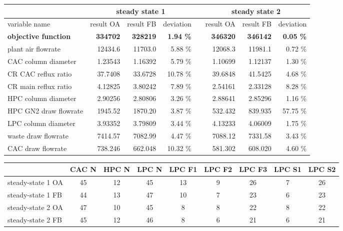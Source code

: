 \begin{minipage}{\linewidth}
    \center
    \footnotesize
    \begin{tabular}{lrrrcrrr}
        & \multicolumn{3}{c}{steady state 1} & & \multicolumn{3}{c}{steady state 2} \\ \hline
        \rowcolor{white} variable name & result OA & result FB & deviation & & result OA & result FB & deviation \\ \hline 
        \textbf{objective function} & \textbf{334702} & \textbf{328219} & \textbf{1.94 \%} & & \textbf{346320} & \textbf{346142} & \textbf{0.05 \%} \\
        plant air flowrate & 12434.6 & 11703.0 & 5.88 \% & & 12068.3 & 11981.1 & 0.72 \% \\
        CAC column diameter & 1.23543 & 1.16392 & 5.79 \% & & 1.10699 & 1.12137 & 1.30 \% \\
        CR CAC reflux ratio & 37.7408 & 33.6728 & 10.78 \% & & 39.6848 & 41.5425 & 4.68 \% \\
        CR main reflux ratio & 4.12825 & 3.80242 & 7.89 \% & & 2.54161 & 2.33128 & 8.28 \% \\
        HPC column diameter & 2.90256 & 2.80806 & 3.26 \% & & 2.88641 & 2.85296 & 1.16 \% \\
        HPC GN2 draw flowrate & 1945.52 & 1870.20 & 3.87 \% & & 532.432 & 839.935 & 57.75 \% \\
        LPC column diameter & 3.93352 & 3.79809 & 3.44 \% & & 4.13233 & 4.06009 & 1.75 \% \\
        waste draw flowrate & 7414.57 & 7082.99 & 4.47 \% & & 7088.12 & 7331.58 & 3.43 \% \\
        CAC draw flowrate & 738.246 & 662.048 & 10.32 \% & & 581.302 & 608.020 & 4.60 \% \\ \hline
    \end{tabular}
\end{minipage}

\begin{minipage}{\linewidth}
    \center
    \footnotesize
    \begin{tabular}{lcccccccc}
        & CAC N & HPC N & LPC N & LPC F1 & LPC F2 & LPC F3 & LPC S1 & LPC S2 \\ \hline
        steady-state 1 OA & 45 & 12 & 45 & 13 & 9 & 26 & 7 & 26 \\
        steady-state 1 FB & 44 & 13 & 47 & 10 & 7 & 23 & 6 & 23 \\
        steady-state 2 OA & 47 & 10 & 45 & 8 & 8 & 22 & 8 & 22 \\
        steady-state 2 FB & 45 & 12 & 46 & 8 & 6 & 21 & 6 & 21 \\ \hline
    \end{tabular}
\end{minipage}
